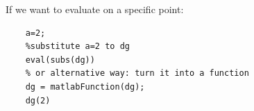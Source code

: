\documentclass{beamer}
\begin{document}
\begin{frame}[fragile]
	If we want to evaluate on a specific point:
	
	\begin{lstlisting}[tabsize=8,basicstyle=\footnotesize]
	% evaluation of diff at x=2
	a=2;
	%substitute a=2 to dg
	eval(subs(dg))
	% or alternative way: turn it into a function
	dg = matlabFunction(dg);
	dg(2)
	\end{lstlisting}
\end{frame}
\end{document}

